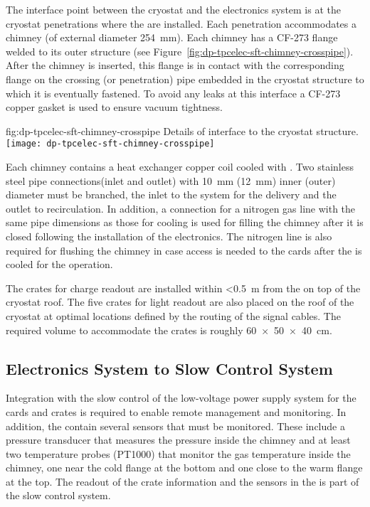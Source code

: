 The interface point between the cryostat and the \dual electronics system is at the cryostat penetrations where the  are installed. Each penetration accommodates a chimney (of external diameter \SI{254}{\mm}). Each chimney has a CF-273 flange welded to its outer structure (see Figure~\ref{fig:dp-tpcelec-sft-chimney-crosspipe}). After the chimney is inserted, this flange is in contact with the corresponding flange on the crossing (or penetration) pipe embedded in the cryostat structure to which it is eventually fastened. To avoid any leaks at this interface a CF-273 copper gasket is used to ensure vacuum tightness.  

\begin{dunefigure}{fig:dp-tpcelec-sft-chimney-crosspipe}
{Details of  interface to the cryostat structure.}
\texttt{[image: dp-tpcelec-sft-chimney-crosspipe]}
\end{dunefigure}

Each chimney contains a heat exchanger copper coil cooled with \lar. Two stainless steel pipe connections(inlet and outlet) with \SI{10}{\mm} (\SI{12}{\mm}) inner (outer) diameter must be branched, the inlet to the system for the \lar delivery and the outlet to recirculation. In addition, a connection for a nitrogen gas line with the same pipe dimensions as those for \lar cooling is used for filling the chimney after it is closed following the installation of the  electronics. The nitrogen line is also required for flushing the chimney in case access is needed to the  cards after the  is cooled for the operation. 

The  crates for charge readout are installed within \SI{<0.5}{\meter} from the  on top of the cryostat roof. The five  crates for light readout are also placed on the roof of the cryostat at optimal locations defined by the routing of the  signal cables. The required volume to accommodate the crates is roughly \SI[product-units=power]{60x50x40}{\cm}. 

\subsection{Electronics System to Slow Control System}
\label{ssec:dp-tpcelec-intfc-sc}

Integration with the slow control of the low-voltage power supply system for the  cards and  crates is required to enable remote management and monitoring. In addition, the  contain several sensors that must be monitored. These include a pressure transducer that measures the pressure inside the chimney and at least two temperature probes (PT1000) that monitor the gas temperature inside the chimney, one near the cold flange at the bottom and one close to the warm flange at the top. The readout of the  crate information and the sensors in the  is part of the slow control system.
